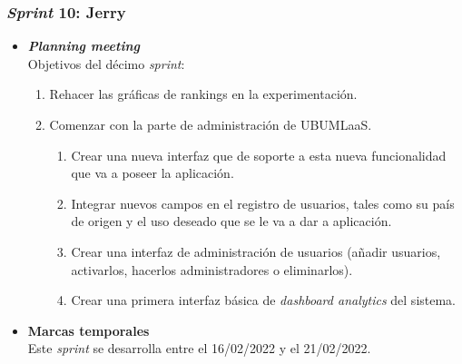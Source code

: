 \subsubsection{\textit{Sprint} 10: Jerry}
\begin{itemize}
\item \textbf{\textit{Planning meeting}}\\
Objetivos del décimo \textit{sprint}:
\begin{enumerate}
\item Rehacer las gráficas de rankings en la experimentación.
\item Comenzar con la parte de administración de UBUMLaaS.
\begin{enumerate}
\item Crear una nueva interfaz que de soporte a esta nueva funcionalidad que va a poseer la aplicación.
\item Integrar nuevos campos en el registro de usuarios, tales como su país de origen y el uso deseado que se le va a dar a aplicación.
\item Crear una interfaz de administración de usuarios (añadir usuarios, activarlos, hacerlos administradores o eliminarlos).
\item Crear una primera interfaz básica de \textit{dashboard analytics} del sistema.
\end{enumerate}
\end{enumerate}

\item \textbf{Marcas temporales}\\
Este \textit{sprint} se desarrolla entre el 16/02/2022 y el 21/02/2022.


\end{itemize}
